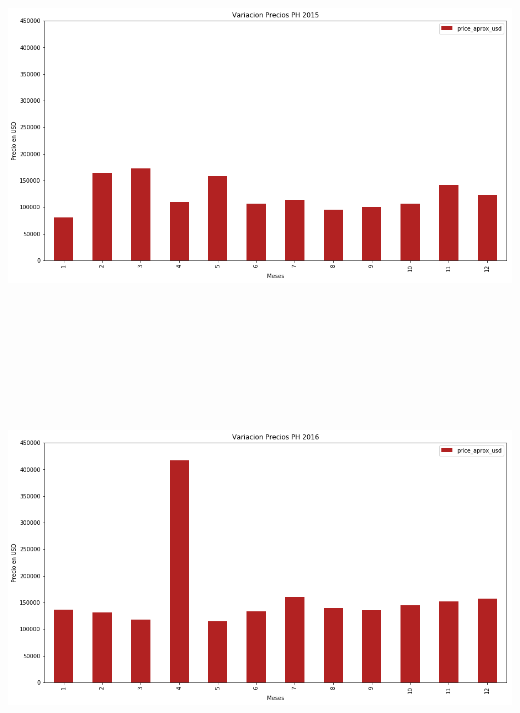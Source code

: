 \documentclass[a4paper, 10pt]{article}
\begin{document}
      \begin{center}
            \includegraphics[width=6in, height=4.2in]{images/vPH2015}
      \end{center}
      \begin{center}
            \includegraphics[width=6in, height=4.2in]{images/vPH2016}
      \end{center}
\end{document}
